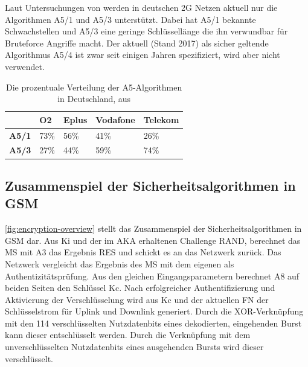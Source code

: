 Laut Untersuchungen von \citet{gsmmap:secrep-ger} werden in deutschen 2G Netzen aktuell nur die Algorithmen A5/1 und A5/3 unterstützt. Dabei hat A5/1 bekannte Schwachstellen und A5/3 eine geringe Schlüssellänge die ihn verwundbar für Bruteforce Angriffe macht. Der aktuell (Stand 2017) als sicher geltende Algorithmus A5/4 \citep{3gpp:55.226} ist zwar seit einigen Jahren spezifiziert, wird aber nicht verwendet.

\begin{table}[H]
\centering
\begin{tabular}{|l|l|l|l|l|}
\rowcolor[HTML]{F7F7F7}
\hline
              & \textbf{O2} & \textbf{Eplus} & \textbf{Vodafone} & \textbf{Telekom} \\ \hline
\textbf{A5/1} & 73\%        & 56\%           & 41\%              & 26\%             \\ \hline
\textbf{A5/3} & 27\%        & 44\%           & 59\%              & 74\%             \\ \hline
\end{tabular}
\caption[Die prozentuale Verteilung der A5-Algorithmen in Deutschland]{Die prozentuale Verteilung der \ac{A5}-Algorithmen in Deutschland, aus \citep{gsmmap:secrep-ger}} \label{a5-usage-germany}
\end{table}

\subsection{Zusammenspiel der Sicherheitsalgorithmen in GSM}

\autoref{fig:encryption-overview} stellt das Zusammenspiel der Sicherheitsalgorithmen in \ac{GSM} dar. Aus \ac{Ki} und der im \ac{AKA} erhaltenen Challenge \ac{RAND}, berechnet das \ac{MS} mit \ac{A3} das Ergebnis \ac{RES} und schickt es an das Netzwerk zurück. Das Netzwerk vergleicht das Ergebnis des \ac{MS} mit dem eigenen als Authentizitätsprüfung. Aus den gleichen Eingangsparametern berechnet \ac{A8} auf beiden Seiten den Schlüssel \ac{Kc}. Nach erfolgreicher Authentifizierung und Aktivierung der Verschlüsselung wird aus \ac{Kc} und der aktuellen \ac{FN} der Schlüsselstrom für Uplink und Downlink generiert. Durch die \ac{XOR}-Verknüpfung mit den 114 verschlüsselten Nutzdatenbits eines dekodierten, eingehenden Burst kann dieser entschlüsselt werden. Durch die Verknüpfung mit dem unverschlüsselten Nutzdatenbits eines ausgehenden Bursts wird dieser verschlüsselt.

